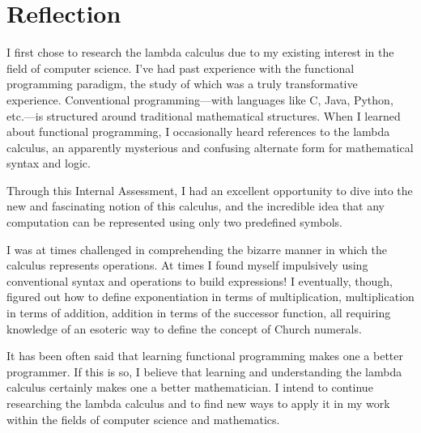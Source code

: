 \documentclass[twocolumn,titlepage,12pt]{article}
\begin{document}
\section{Reflection}
I first chose to research the lambda calculus due to my existing interest in the field of computer science. I've had past experience with the functional programming paradigm, the study of which was a truly transformative experience. Conventional programming---with languages like C, Java, Python, etc.---is structured around traditional mathematical structures. When I learned about functional programming, I occasionally heard references to the lambda calculus, an apparently mysterious and confusing alternate form for mathematical syntax and logic.

Through this Internal Assessment, I had an excellent opportunity to dive into the new and fascinating notion of this calculus, and the incredible idea that any computation can be represented using only two predefined symbols.

I was at times challenged in comprehending the bizarre manner in which the calculus represents operations. At times I found myself impulsively using conventional syntax and operations to build expressions! I eventually, though, figured out how to define exponentiation in terms of multiplication, multiplication in terms of addition, addition in terms of the successor function, all requiring knowledge of an esoteric way to define the concept of Church numerals.

It has been often said that learning functional programming makes one a better programmer. If this is so, I believe that learning and understanding the lambda calculus certainly makes one a better mathematician. I intend to continue researching the lambda calculus and to find new ways to apply it in my work within the fields of computer science and mathematics.

\newpage


\end{document}
